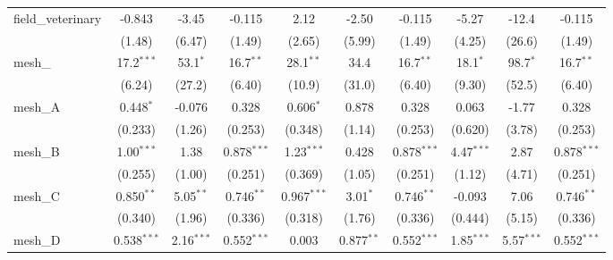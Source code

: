 \begin{tabular}{lccccccccc}
   field\_veterinary                                           & -0.843         & -3.45          & -0.115         & 2.12           & -2.50         & -0.115         & -5.27          & -12.4          & -0.115\\   
                                                               & (1.48)         & (6.47)         & (1.49)         & (2.65)         & (5.99)        & (1.49)         & (4.25)         & (26.6)         & (1.49)\\   
   mesh\_                                                      & 17.2$^{***}$   & 53.1$^{*}$     & 16.7$^{**}$    & 28.1$^{**}$    & 34.4          & 16.7$^{**}$    & 18.1$^{*}$     & 98.7$^{*}$     & 16.7$^{**}$\\   
                                                               & (6.24)         & (27.2)         & (6.40)         & (10.9)         & (31.0)        & (6.40)         & (9.30)         & (52.5)         & (6.40)\\   
   mesh\_A                                                     & 0.448$^{*}$    & -0.076         & 0.328          & 0.606$^{*}$    & 0.878         & 0.328          & 0.063          & -1.77          & 0.328\\   
                                                               & (0.233)        & (1.26)         & (0.253)        & (0.348)        & (1.14)        & (0.253)        & (0.620)        & (3.78)         & (0.253)\\   
   mesh\_B                                                     & 1.00$^{***}$   & 1.38           & 0.878$^{***}$  & 1.23$^{***}$   & 0.428         & 0.878$^{***}$  & 4.47$^{***}$   & 2.87           & 0.878$^{***}$\\   
                                                               & (0.255)        & (1.00)         & (0.251)        & (0.369)        & (1.05)        & (0.251)        & (1.12)         & (4.71)         & (0.251)\\   
   mesh\_C                                                     & 0.850$^{**}$   & 5.05$^{**}$    & 0.746$^{**}$   & 0.967$^{***}$  & 3.01$^{*}$    & 0.746$^{**}$   & -0.093         & 7.06           & 0.746$^{**}$\\   
                                                               & (0.340)        & (1.96)         & (0.336)        & (0.318)        & (1.76)        & (0.336)        & (0.444)        & (5.15)         & (0.336)\\   
   mesh\_D                                                     & 0.538$^{***}$  & 2.16$^{***}$   & 0.552$^{***}$  & 0.003          & 0.877$^{**}$  & 0.552$^{***}$  & 1.85$^{***}$   & 5.57$^{***}$   & 0.552$^{***}$\\   

\end{tabular}
